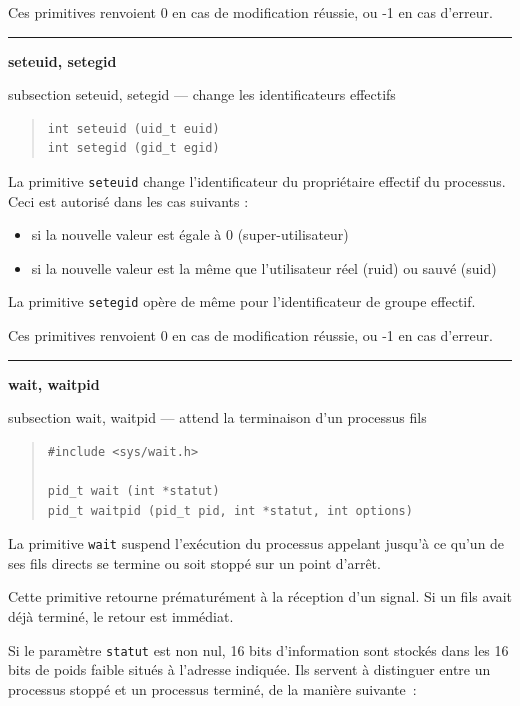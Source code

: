 \documentclass [twoside] {report}
\newcommand {\primitive} [1]
    {
	\phantomsection
	{\large \textbf {#1}}
	\addcontentsline {toc} {subsection} {#1}
    }
\newcommand {\separation}
    {
	\vspace {5mm}
	\nopagebreak
	\hrule
    }
\begin{document}
Ces primitives renvoient 0 en cas de modification
réussie, ou -1 en cas d'erreur.




\separation
\primitive {seteuid, setegid} --- change les identificateurs effectifs

\begin {quote}
\begin {verbatim}
int seteuid (uid_t euid)
int setegid (gid_t egid)
\end{verbatim}
\end {quote}

La primitive \texttt {seteuid} change l'identificateur du propriétaire
effectif du processus. Ceci est autorisé dans les cas suivants :

\begin {itemize}
    \item si la nouvelle valeur est égale à 0 (super-utilisateur)
    \item si la nouvelle valeur est la même que l'utilisateur réel
	(ruid) ou sauvé (suid)
\end {itemize}

La primitive \texttt {setegid} opère de même pour l'identificateur
de groupe effectif.

Ces primitives renvoient 0 en cas de modification
réussie, ou -1 en cas d'erreur.




\separation
\primitive {wait, waitpid} --- attend la terminaison d'un processus fils

\begin {quote}
\begin {verbatim}
#include <sys/wait.h>

pid_t wait (int *statut)
pid_t waitpid (pid_t pid, int *statut, int options)
\end{verbatim}
\end {quote}

La primitive \texttt {wait} suspend l'exécution du
processus appelant jusqu'à ce qu'un de ses fils
directs se termine ou soit stoppé sur un point
d'arrêt.

Cette primitive retourne prématurément à la
réception d'un signal. Si un fils avait déjà
terminé, le retour est immédiat.

Si le paramètre \texttt {statut} est non nul, 16 bits
d'information sont stockés dans les 16 bits de
poids faible situés à l'adresse indiquée. Ils
servent à distinguer entre un processus stoppé et
un processus terminé, de la manière suivante~:
\end{document}
